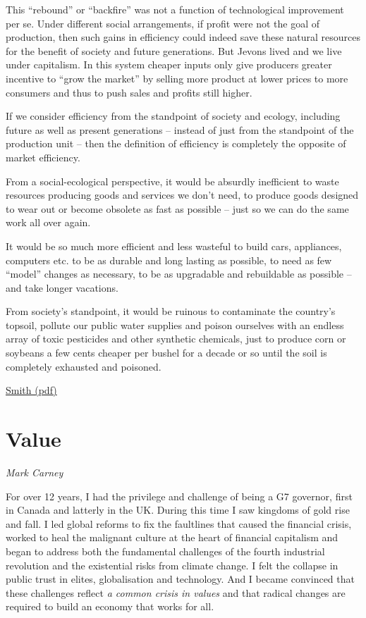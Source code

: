 \documentclass[
]{book}
\begin{document}
This ``rebound'' or ``backfire'' was not a function of technological improvement per
se. Under different social arrangements, if profit were not the goal of production,
then such gains in efficiency could indeed save these natural resources for the
benefit of society and future generations. But Jevons lived and we live under
capitalism. In this system cheaper inputs only give producers greater incentive to
``grow the market'' by selling more product at lower prices to more consumers and
thus to push sales and profits still higher.

If we consider efficiency from the standpoint of society and ecology, including
future as well as present generations -- instead of just from the standpoint of the
production unit -- then the definition of efficiency is completely the opposite of
market efficiency.

From a social-ecological perspective, it would be absurdly
inefficient to waste resources producing goods and services we don't need, to
produce goods designed to wear out or become obsolete as fast as possible -- just so
we can do the same work all over again.

It would be
so much more efficient and less wasteful to build cars, appliances, computers etc. to
be as durable and long lasting as possible, to need as few ``model'' changes as
necessary, to be as upgradable and rebuildable as possible -- and take longer
vacations.

From society's standpoint, it would be
ruinous to contaminate the country's topsoil, pollute our public water supplies and
poison ourselves with an endless array of toxic pesticides and other synthetic
chemicals, just to produce corn or soybeans a few cents cheaper per bushel for a
decade or so until the soil is completely exhausted and poisoned.

\href{pdf/Richard_Smith_Green_Capitalism_the_God_that_Failed.pdf}{Smith (pdf)}

\hypertarget{value}{%
\chapter{Value}\label{value}}

\emph{Mark Carney}

For over 12 years, I had the privilege and challenge of being a G7 governor, first in Canada and latterly in the UK. During this time I saw kingdoms of gold rise and fall. I led global reforms to fix the faultlines that caused the financial crisis, worked to heal the malignant culture at the heart of financial capitalism and began to address both the fundamental challenges of the fourth industrial revolution and the existential risks from climate change. I felt the collapse in public trust in elites, globalisation and technology. And I became convinced that these challenges reflect \emph{a common crisis in values} and that radical changes are required to build an economy that works for all.
\end{document}

